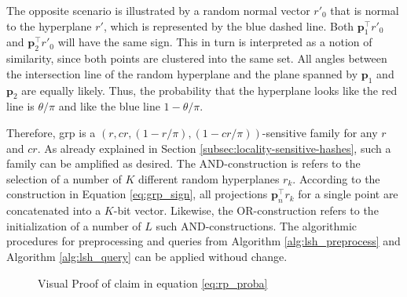 \documentclass[../../../main.tex]{subfiles}
\begin{document}
The opposite scenario is illustrated by a random normal vector $r'_0$ that is normal to the hyperplane $r'$, which is represented by the blue dashed line. Both $\bm{p}_1^\top r'_0$ and  $\bm{p}_2^\top r'_0$ will have the same sign. This in turn is interpreted as a notion of similarity, since both points are clustered into the same set. All angles between the intersection line of the random hyperplane and the plane spanned by $\bm{p}_1$ and $\bm{p}_2$ are equally likely. Thus, the probability that the hyperplane looks like the red line is $\theta / \pi$ and like the blue line $1 - \theta / \pi$.

Therefore, \gls{grp} is a $(r, cr, (1-r/\pi), (1-cr/\pi))$-sensitive family for any $r$ and $cr$. As already explained in Section \ref{subsec:locality-sensitive-hashes}, such a family can be amplified as desired. The AND-construction is refers to the selection of a number of $K$ different random hyperplanes $r_k$. According to the construction in Equation \ref{eq:grp_sign}, all projections $\bm{p}_n^\top r_k$ for a single point are concatenated into a $K$-bit vector. Likewise, the OR-construction refers to the initialization of a number of $L$ such AND-constructions. The algorithmic procedures for preprocessing and queries from Algorithm \ref{alg:lsh_preprocess} and Algorithm \ref{alg:lsh_query} can be applied withoud change. 

\begin{figure}[t]
    \centering
    
    \caption{Visual Proof of claim in equation \ref{eq:rp_proba}}
    \label{fig:rp_2d}
\end{figure}
\end{document}

